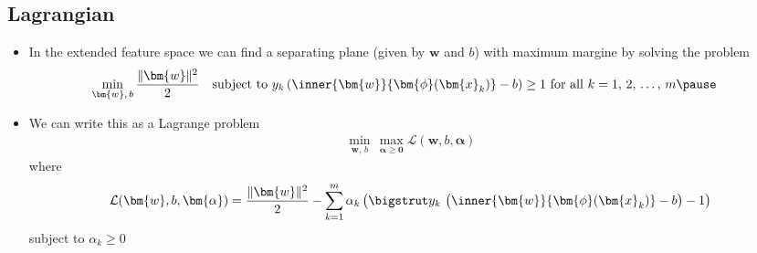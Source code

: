 
\begin{slide}
\section[-2]{Lagrangian}

\begin{PauseHighLight}
  \begin{itemize}
  \item In the extended feature space we can find a separating
    plane (given by $\bm{w}$ and $b$) with maximum margine by solving
    the problem
   \begin{align*}
     \hspace*{-1em} \min_{\bm{w},\,b} \frac{\|\bm{w}\|^2}{2} \quad 
     \mbox{subject to $y_k\left(\inner{\bm{w}}{\bm{\phi}(\bm{x}_k)} -
     b\right) \geq 1$ for all $k=1,\,2,\,\ldots,\,m$}\pause
    \end{align*}
  \item We can write this as a Lagrange problem
    \begin{align*}
      \min_{\bm{w},\,b} \, \max_{\bm{\alpha}\geq\bm{0}} \mathcal{L}(\bm{w},b,\bm{\alpha})
    \end{align*}
    where
    \begin{align*}
      \mathcal{L}(\bm{w},b,\bm{\alpha}) = \frac{\|\bm{w}\|^2}{2}
      - \sum_{k=1}^m \alpha_k \left(\bigstrut  y_k\,\left( \strut\inner{\bm{w}}{\bm{\phi}(\bm{x}_k)} -
     b\right) - 1\right)
    \end{align*}
    subject to $\alpha_k \geq 0$\pause
  \end{itemize}
\end{PauseHighLight}


\end{slide}



